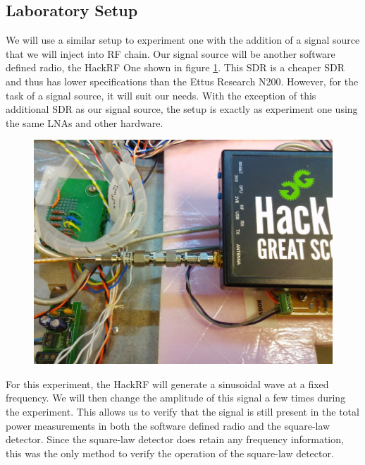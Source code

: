 \subsection{Laboratory Setup}
We will use a similar setup to experiment one with the addition of a signal source that we will inject into RF chain.  Our signal source will be another software defined radio, the HackRF One shown in figure \ref{HackRF}.  This SDR is a cheaper SDR and thus has lower specifications than the Ettus Research N200.  However, for the task of a signal source, it will suit our needs.  With the exception of this additional SDR as our signal source, the setup is exactly as experiment one using the same LNAs and other hardware.

\begin{figure}[h!tb] \centering

\includegraphics[width=\textwidth]{Images/Hack_RF.jpg}
\label{HackRF}
\end{figure} 

For this experiment, the HackRF will generate a sinusoidal wave at a fixed frequency.  We will then change the amplitude of this signal a few times during the experiment.  This allows us to verify that the signal is still present in the total power measurements in both the software defined radio and the square-law detector.  Since the square-law detector does retain any frequency information, this was the only method to verify the operation of the square-law detector.   

